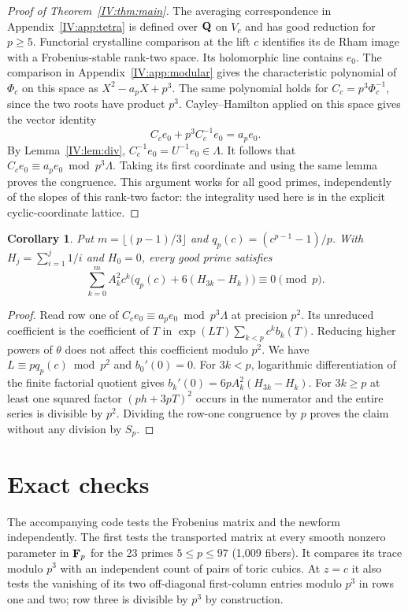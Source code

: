\documentclass[11pt,letterpaper]{article}
\newtheorem{corollary}[theorem]{Corollary}
\theoremstyle{definition}
\theoremstyle{remark}
\begin{document}
\begin{proof}[Proof of Theorem~\ref{IV:thm:main}]
The averaging correspondence in Appendix~\ref{IV:app:tetra} is defined
over $\mathbf Q$ on $V_c$ and has good reduction for $p\ge5$. Functorial
crystalline comparison at the lift $c$ identifies its de Rham image
with a Frobenius-stable rank-two space. Its holomorphic line contains
$e_0$. The comparison in Appendix~\ref{IV:app:modular} gives the
characteristic polynomial of $\Phi_c$ on this space as
$X^2-a_pX+p^3$. The same polynomial holds for $C_c=p^3\Phi_c^{-1}$,
since the two roots have product $p^3$. Cayley--Hamilton applied on
this space gives the vector identity
\[
        C_c e_0+p^3 C_c^{-1}e_0=a_p e_0 .
\]
By Lemma~\ref{IV:lem:div}, $C_c^{-1}e_0=U^{-1}e_0\in\Lambda$.
It follows that $C_c e_0\equiv a_p e_0\bmod p^3\Lambda$.
Taking its first coordinate and using the same lemma proves the
congruence. This argument works for all good primes, independently
of the slopes of this rank-two factor: the integrality used here
is in the explicit cyclic-coordinate lattice.
\end{proof}

\begin{corollary}\label{IV:cor:harmonic}
Put $m=\lfloor(p-1)/3\rfloor$ and $q_p(c)=(c^{p-1}-1)/p$.
With $H_j=\sum_{i=1}^{j}1/i$ and $H_0=0$, every good prime satisfies
\[
 \sum_{k=0}^{m} A_k^2 c^k
       \bigl(q_p(c)+6(H_{3k}-H_k)\bigr)\equiv0\pmod p .
\]
\end{corollary}
\begin{proof}
Read row one of $C_c e_0\equiv a_p e_0\bmod p^3\Lambda$ at precision
$p^2$. Its unreduced coefficient is the coefficient of $T$ in
$\exp(LT)\sum_{k<p}c^k b_k(T)$. Reducing higher powers of $\theta$
does not affect this coefficient modulo $p^2$. We have
$L\equiv p q_p(c)\bmod p^2$ and $b_0'(0)=0$. For $3k<p$,
logarithmic differentiation of the finite factorial quotient gives
$b_k'(0)=6pA_k^2(H_{3k}-H_k)$. For $3k\ge p$ at least one squared
factor $(p h+3pT)^2$ occurs in the numerator and the entire series
is divisible by $p^2$. Dividing the row-one congruence by $p$
proves the claim without any division by $S_p$.
\end{proof}
\section{Exact checks}\label{IV:sec:checks}
The accompanying code tests the Frobenius matrix and the newform independently.
The first tests the transported matrix at every smooth nonzero
parameter in $\mathbf F_p$ for the 23 primes $5\le p\le97$ (1,009 fibers).
It compares its trace modulo $p^3$ with an independent count of pairs
of toric cubics. At $z=c$ it also tests the vanishing of its two
off-diagonal first-column entries modulo $p^3$ in rows one and two;
row three is divisible by $p^3$ by construction.
\end{document}
